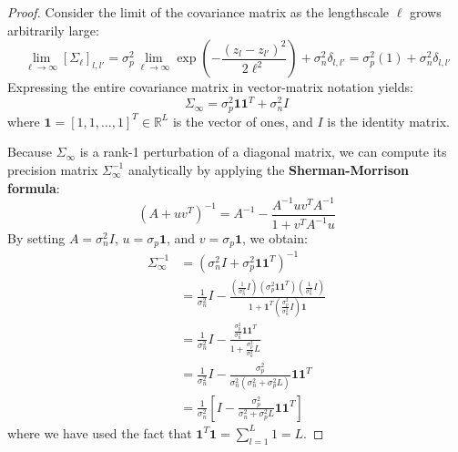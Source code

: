 \documentclass{article}
\theoremstyle{plain}
\theoremstyle{definition}
\theoremstyle{remark}
\begin{document}
\begin{proof}
Consider the limit of the covariance matrix as the lengthscale $\ell$ grows arbitrarily large:
\begin{equation}
\lim_{\ell \to \infty} [\Sigma_{\ell}]_{l, l'} = \sigma_p^2 \lim_{\ell \to \infty} \exp\left( - \frac{(z_l - z_{l'})^2}{2\ell^2} \right) + \sigma_n^2 \delta_{l, l'} = \sigma_p^2 (1) + \sigma_n^2 \delta_{l, l'}
\end{equation}
Expressing the entire covariance matrix in vector-matrix notation yields:
\begin{equation}
\Sigma_{\infty} = \sigma_p^2 \mathbf{1} \mathbf{1}^T + \sigma_n^2 I
\label{eq:sigma_inf}
\end{equation}
where $\mathbf{1} = [1, 1, \dots, 1]^T \in \mathbb{R}^L$ is the vector of ones, and $I$ is the identity matrix.

Because $\Sigma_{\infty}$ is a rank-1 perturbation of a diagonal matrix, we can compute its precision matrix $\Sigma_{\infty}^{-1}$ analytically by applying the \textbf{Sherman-Morrison formula}:
\begin{equation}
(A + u v^T)^{-1} = A^{-1} - \frac{A^{-1} u v^T A^{-1}}{1 + v^T A^{-1} u}
\label{eq:sherman_morrison}
\end{equation}
By setting $A = \sigma_n^2 I$, $u = \sigma_p \mathbf{1}$, and $v = \sigma_p \mathbf{1}$, we obtain:
\begin{equation}
\begin{aligned}
\Sigma_{\infty}^{-1} &= \left( \sigma_n^2 I + \sigma_p^2 \mathbf{1} \mathbf{1}^T \right)^{-1} \\
&= \frac{1}{\sigma_n^2} I - \frac{ \left(\frac{1}{\sigma_n^2} I\right) \left(\sigma_p^2 \mathbf{1} \mathbf{1}^T\right) \left(\frac{1}{\sigma_n^2} I\right) }{ 1 + \mathbf{1}^T \left( \frac{\sigma_p^2}{\sigma_n^2} I \right) \mathbf{1} } \\
&= \frac{1}{\sigma_n^2} I - \frac{ \frac{\sigma_p^2}{\sigma_n^4} \mathbf{1} \mathbf{1}^T }{ 1 + \frac{\sigma_p^2}{\sigma_n^2} L } \\
&= \frac{1}{\sigma_n^2} I - \frac{\sigma_p^2}{\sigma_n^2 (\sigma_n^2 + \sigma_p^2 L)} \mathbf{1} \mathbf{1}^T \\
&= \frac{1}{\sigma_n^2} \left[ I - \frac{\sigma_p^2}{\sigma_n^2 + \sigma_p^2 L} \mathbf{1} \mathbf{1}^T \right]
\end{aligned}
\end{equation}
where we have used the fact that $\mathbf{1}^T \mathbf{1} = \sum_{l=1}^L 1 = L$.


\end{proof}
\end{document}
